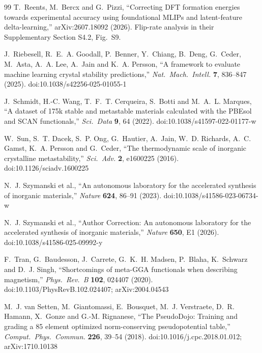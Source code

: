 \documentclass[11pt]{article}
\begin{document}
\begin{thebibliography}{99}
 T.~Reents, M.~Bercx and G.~Pizzi, ``Correcting DFT
formation energies towards experimental accuracy using foundational MLIPs and
latent-feature delta-learning,'' arXiv:2607.18092 (2026). Flip-rate analysis in
their Supplementary Section S4.2, Fig.~S9.

 J.~Riebesell, R.~E.~A. Goodall, P.~Benner,
Y.~Chiang, B.~Deng, G.~Ceder, M.~Asta, A.~A. Lee, A.~Jain and K.~A. Persson, ``A framework
to evaluate machine learning crystal stability predictions,'' \emph{Nat.~Mach.~Intell.}
\textbf{7}, 836--847 (2025). doi:10.1038/s42256-025-01055-1

 J.~Schmidt, H.-C. Wang, T.~F.~T. Cerqueira,
S.~Botti and M.~A.~L. Marques, ``A dataset of 175k stable and metastable materials
calculated with the PBEsol and SCAN functionals,'' \emph{Sci.~Data} \textbf{9}, 64 (2022).
doi:10.1038/s41597-022-01177-w

 W.~Sun, S.~T. Dacek, S.~P. Ong, G.~Hautier, A.~Jain,
W.~D. Richards, A.~C. Gamst, K.~A. Persson and G.~Ceder, ``The thermodynamic scale of
inorganic crystalline metastability,'' \emph{Sci.~Adv.} \textbf{2}, e1600225 (2016).
doi:10.1126/sciadv.1600225

 N.~J. Szymanski et al., ``An autonomous
laboratory for the accelerated synthesis of inorganic materials,'' \emph{Nature}
\textbf{624}, 86--91 (2023). doi:10.1038/s41586-023-06734-w

 N.~J. Szymanski et al., ``Author
Correction: An autonomous laboratory for the accelerated synthesis of inorganic
materials,'' \emph{Nature} \textbf{650}, E1 (2026). doi:10.1038/s41586-025-09992-y

 F.~Tran, G.~Baudesson, J.~Carrete, G.~K.~H. Madsen,
P.~Blaha, K.~Schwarz and D.~J. Singh, ``Shortcomings of meta-GGA functionals when
describing magnetism,'' \emph{Phys.~Rev.~B} \textbf{102}, 024407 (2020).
doi:10.1103/PhysRevB.102.024407; arXiv:2004.04543

 M.~J. van Setten, M.~Giantomassi,
E.~Bousquet, M.~J. Verstraete, D.~R. Hamann, X.~Gonze and G.-M. Rignanese, ``The
PseudoDojo: Training and grading a 85 element optimized norm-conserving pseudopotential
table,'' \emph{Comput.~Phys.~Commun.} \textbf{226}, 39--54 (2018).
doi:10.1016/j.cpc.2018.01.012; arXiv:1710.10138


\end{thebibliography}
\end{document}
